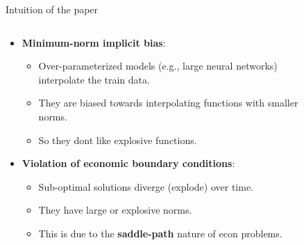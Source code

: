 \documentclass[aspectratio=169,10pt]{beamer}
\newcommand{\emphcolor}[1]{\textbf{\textcolor{emphcolorval}{#1}}}
\begin{document}
\begin{frame}{Intuition of the paper}
	\begin{columns}
		\begin{column}{0.5\textwidth}
			\begin{itemize}
				\item \emphcolor{Minimum-norm implicit bias}: 
				\begin{itemize}
					\item Over-parameterized models (e.g., large neural networks) interpolate the train data.
					\vspace{0.05in}
					\item They are biased towards interpolating functions with smaller norms. 
					\item So they dont like explosive functions.
				\end{itemize}
				\vspace{0.1in}
				\item \emphcolor{Violation of economic boundary conditions}:
				\begin{itemize}
					\item Sub-optimal solutions diverge (explode) over time.
					\vspace{0.05in}
					\item They have large or explosive norms.
					\vspace{0.05in}
					\item This is due to the \emphcolor{saddle-path} nature of econ problems.
				\end{itemize}
			\end{itemize}
		\end{column}
		\begin{column}{0.5\textwidth}
		\begin{figure}[t!]
			\centering

\end{figure}
\end{column}
\end{columns}
\end{frame}
\end{document}
